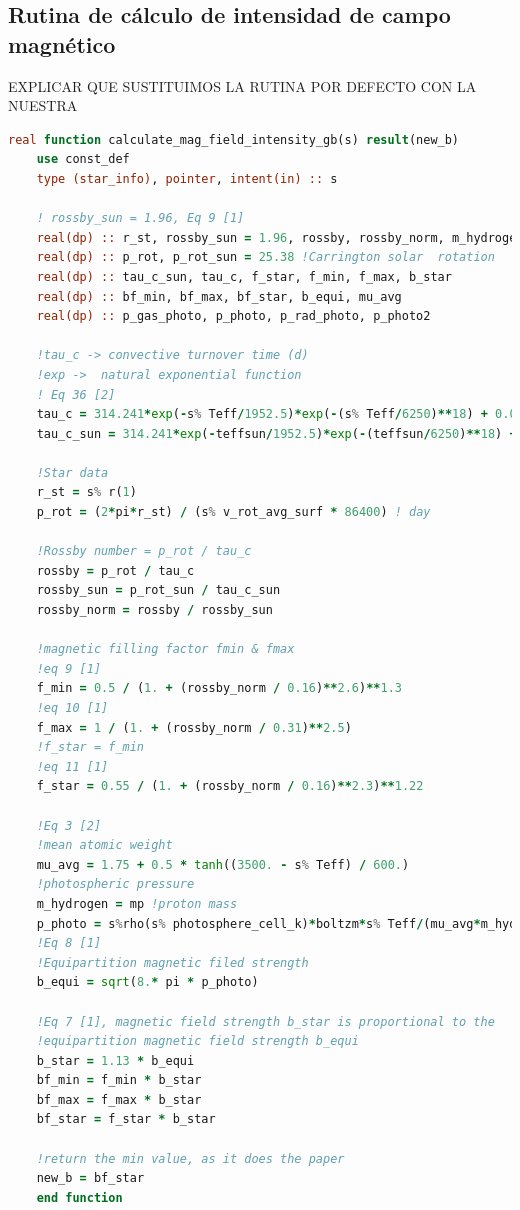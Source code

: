 \subsection{Rutina de cálculo de intensidad de campo magnético}
EXPLICAR QUE SUSTITUIMOS LA RUTINA POR DEFECTO CON LA NUESTRA
\begin{lstlisting}[language=Fortran, caption={Rutina de cálculo de intensidad de campo magnético.}, label={lst:jdot_mf_intensity}]
	real function calculate_mag_field_intensity_gb(s) result(new_b)
	use const_def
	type (star_info), pointer, intent(in) :: s
	
	! rossby_sun = 1.96, Eq 9 [1]
	real(dp) :: r_st, rossby_sun = 1.96, rossby, rossby_norm, m_hydrogen
	real(dp) :: p_rot, p_rot_sun = 25.38 !Carrington solar  rotation
	real(dp) :: tau_c_sun, tau_c, f_star, f_min, f_max, b_star
	real(dp) :: bf_min, bf_max, bf_star, b_equi, mu_avg
	real(dp) :: p_gas_photo, p_photo, p_rad_photo, p_photo2
	
	!tau_c -> convective turnover time (d)
	!exp ->  natural exponential function
	! Eq 36 [2]
	tau_c = 314.241*exp(-s% Teff/1952.5)*exp(-(s% Teff/6250)**18) + 0.002 
	tau_c_sun = 314.241*exp(-teffsun/1952.5)*exp(-(teffsun/6250)**18) + 0.002
	
	!Star data
	r_st = s% r(1)
	p_rot = (2*pi*r_st) / (s% v_rot_avg_surf * 86400) ! day
	
	!Rossby number = p_rot / tau_c
	rossby = p_rot / tau_c
	rossby_sun = p_rot_sun / tau_c_sun
	rossby_norm = rossby / rossby_sun
	
	!magnetic filling factor fmin & fmax
	!eq 9 [1]
	f_min = 0.5 / (1. + (rossby_norm / 0.16)**2.6)**1.3 
	!eq 10 [1]
	f_max = 1 / (1. + (rossby_norm / 0.31)**2.5)
	!f_star = f_min
	!eq 11 [1]
	f_star = 0.55 / (1. + (rossby_norm / 0.16)**2.3)**1.22
	
	!Eq 3 [2]
	!mean atomic weight
	mu_avg = 1.75 + 0.5 * tanh((3500. - s% Teff) / 600.)
	!photospheric pressure 
	m_hydrogen = mp !proton mass       
	p_photo = s%rho(s% photosphere_cell_k)*boltzm*s% Teff/(mu_avg*m_hydrogen)
	!Eq 8 [1]
	!Equipartition magnetic filed strength
	b_equi = sqrt(8.* pi * p_photo)
	
	!Eq 7 [1], magnetic field strength b_star is proportional to the
	!equipartition magnetic field strength b_equi
	b_star = 1.13 * b_equi
	bf_min = f_min * b_star
	bf_max = f_max * b_star
	bf_star = f_star * b_star
	
	!return the min value, as it does the paper
	new_b = bf_star
	end function
	
\end{lstlisting}

